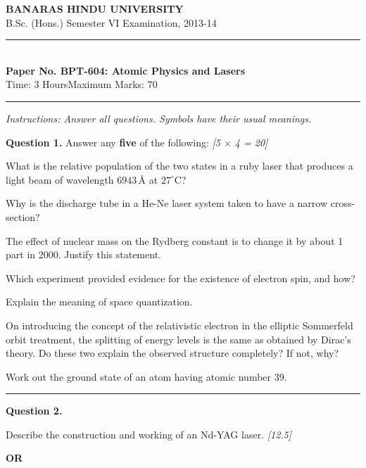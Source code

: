 \documentclass[11pt,a4paper]{article}
\newcommand{\pts}[1]{\hfill   \textit{[#1]}}
\begin{document}
\begin{center}
  {\large\bfseries BANARAS HINDU UNIVERSITY}\\[2pt]
  {\normalsize B.Sc. (Hons.) Semester VI Examination, 2013-14}\\[6pt]
  \rule{0.8\linewidth}{0.5pt}\\[6pt]
  {\large\bfseries Paper No. BPT-604: Atomic Physics and Lasers}\\[4pt]
  {\normalsize Time: 3 Hours\hfill Maximum Marks: 70}
\end{center}
\rule{\linewidth}{0.4pt}
\smallskip



\noindent   \textit{Instructions: Answer all questions. Symbols have their usual meanings.}
\bigskip




\noindent   \textbf{Question 1.} Answer any   \textbf{five} of the following: \pts{5 $ \times$ 4 = 20}

\begin{parts}
  \item What is the relative population of the two states in a ruby laser that produces a light beam of wavelength $6943\, \text{\AA}$ at $27^\circ \text{C}$?
  \item Why is the discharge tube in a He-Ne laser system taken to have a narrow cross-section?
  \item The effect of nuclear mass on the Rydberg constant is to change it by about 1 part in 2000. Justify this statement.
  \item Which experiment provided evidence for the existence of electron spin, and how?
  \item Explain the meaning of space quantization.
  \item On introducing the concept of the relativistic electron in the elliptic Sommerfeld orbit treatment, the splitting of energy levels is the same as obtained by Dirac's theory. Do these two explain the observed structure completely? If not, why?
  \item Work out the ground state of an atom having atomic number 39.
\end{parts}

\medskip\rule{\linewidth}{0.2pt}




\noindent   \textbf{Question 2.}

\begin{parts}
  \item Describe the construction and working of an Nd-YAG laser. \pts{12.5}
\end{parts}
\hfill   \textbf{OR}
\end{document}
